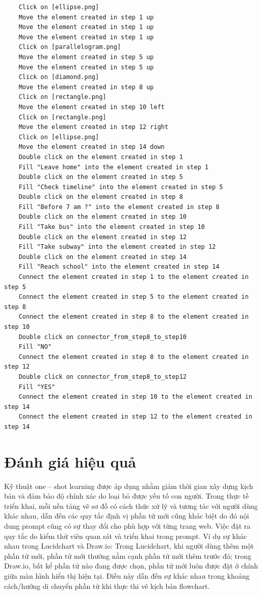 \documentclass[a4paper, 12pt]{report}
\begin{document}
{{\footnotesize{
\begin{verbatim}
    Click on [ellipse.png]
    Move the element created in step 1 up
    Move the element created in step 1 up
    Move the element created in step 1 up
    Click on [parallelogram.png]
    Move the element created in step 5 up
    Move the element created in step 5 up
    Click on [diamond.png]
    Move the element created in step 8 up
    Click on [rectangle.png]
    Move the element created in step 10 left
    Click on [rectangle.png]
    Move the element created in step 12 right
    Click on [ellipse.png]
    Move the element created in step 14 down
    Double click on the element created in step 1
    Fill "Leave home" into the element created in step 1
    Double click on the element created in step 5
    Fill "Check timeline" into the element created in step 5
    Double click on the element created in step 8
    Fill "Before 7 am ?" into the element created in step 8
    Double click on the element created in step 10
    Fill "Take bus" into the element created in step 10
    Double click on the element created in step 12
    Fill "Take subway" into the element created in step 12
    Double click on the element created in step 14
    Fill "Reach school" into the element created in step 14
    Connect the element created in step 1 to the element created in step 5
    Connect the element created in step 5 to the element created in step 8
    Connect the element created in step 8 to the element created in step 10
    Double click on connector_from_step8_to_step10
    Fill "NO"
    Connect the element created in step 8 to the element created in step 12
    Double click on connector_from_step8_to_step12
    Fill "YES"
    Connect the element created in step 10 to the element created in step 14
    Connect the element created in step 12 to the element created in step 14
\end{verbatim}
}}


\section{Đánh giá hiệu quả}
Kỹ thuật one -- shot learning được áp dụng nhằm giảm thời gian xây dựng kịch bản và đảm bảo độ chính xác do loại bỏ được yếu tố con người. Trong thực tế triển khai, mỗi nền tảng vẽ sơ đồ có cách thức xử lý và tương tác với người dùng khác nhau, dẫn đến các quy tắc định vị phần tử mới cũng khác biệt do đó nội dung prompt cũng có sự thay đổi cho phù hợp với từng trang web. Việc đặt ra quy tắc do kiểm thử viên quan sát và triển khai trong prompt. Ví dụ sự khác nhau trong Lucidchart và Draw.io: Trong Lucidchart, khi người dùng thêm một phần tử mới, phần tử mới thường nằm cạnh phần tử mới thêm trước đó; trong Draw.io, bất kể phần tử nào đang được chọn, phần tử mới luôn được đặt ở chính giữa màn hình hiển thị hiện tại. Điều này dẫn đến sự khác nhau trong khoảng cách/hướng di chuyển phần tử khi thực thi vẽ kịch bản flowchart.


}
\end{document}
